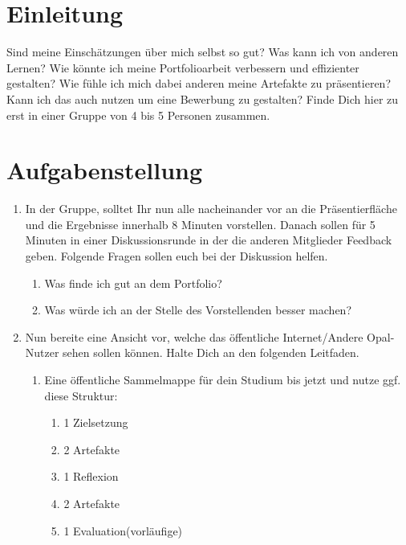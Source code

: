 \documentclass[a4paper,oneside]{scrarticle}
\begin{document}
	\section*{Einleitung}
	Sind meine Einschätzungen über mich selbst so gut? Was kann ich von anderen Lernen? Wie könnte ich meine Portfolioarbeit verbessern und effizienter gestalten? Wie fühle ich mich dabei anderen meine Artefakte zu präsentieren? Kann ich das auch nutzen um eine Bewerbung zu gestalten? Finde Dich hier zu erst in einer Gruppe von 4 bis 5 Personen zusammen.
	
	\section*{Aufgabenstellung}

	\begin{enumerate}
		\item In der Gruppe, solltet Ihr nun alle nacheinander vor an die Präsentierfläche und die Ergebnisse innerhalb 8 Minuten vorstellen. Danach sollen für 5 Minuten in einer Diskussionsrunde in der die anderen Mitglieder Feedback geben. Folgende Fragen sollen euch bei der Diskussion helfen. 
		\begin{enumerate}
			\item Was finde ich gut an dem Portfolio?
			\item Was würde ich an der Stelle des Vorstellenden besser machen?
		\end{enumerate}
		\item Nun bereite eine Ansicht vor, welche das öffentliche Internet/Andere Opal-Nutzer sehen sollen können. Halte Dich an den folgenden Leitfaden.
		\begin{enumerate}
			\item Eine öffentliche Sammelmappe für dein Studium bis jetzt und nutze ggf. diese Struktur:
			\begin{enumerate}
				\item 1 Zielsetzung
				\item 2 Artefakte
				\item 1 Reflexion
				\item 2 Artefakte
				\item 1 Evaluation(vorläufige)
			\end{enumerate}
		\end{enumerate}

	\end{enumerate}
\end{document}
